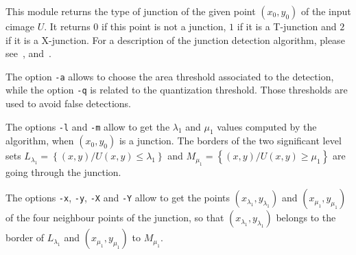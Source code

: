 This module returns the type of junction of the given point $(x_0,y_0)$
of the input cimage $U$. 
It returns $0$ if this point is not a junction, $1$ if it is a T-junction
and $2$ if it is a X-junction.
For a description of the junction detection algorithm, 
please see~\cite{caselles.coll.ea:kanizsa},\cite{caselles.coll.ea:topographic} 
and~\cite{froment:functional}.

The option \verb+-a+ allows to choose the area threshold associated
to the detection, while the option \verb+-q+ is related to the quantization 
threshold. Those thresholds are used to avoid false detections.

The options \verb+-l+ and \verb+-m+ allow to get the $\lambda_1$ and
$\mu_1$ values computed by the algorithm, when  $(x_0,y_0)$ is a junction.
The borders of the two significant level sets 
$L_{\lambda_1} = \left\{(x,y) /U(x,y) \leq \lambda_1 \right\}$ and 
$M_{\mu_1} = \left\{(x,y) /U(x,y) \geq \mu_1 \right\}$ are going 
through the junction.

The options \verb+-x+, \verb+-y+, \verb+-X+ and \verb+-Y+ allow to get
the points $(x_{\lambda_1}, y_{\lambda_1})$ 
and $(x_{\mu_1}, y_{\mu_1})$ of the
four neighbour points of the junction, so that 
$(x_{\lambda_1}, y_{\lambda_1})$ belongs to the border of 
$L_{\lambda_1}$ and  $(x_{\mu_1}, y_{\mu_1})$ to $M_{\mu_1}$.

